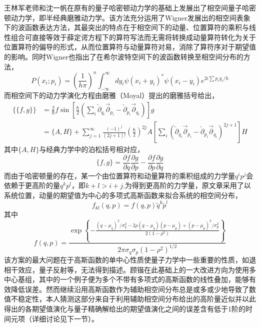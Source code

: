 王林军老师和沈一帆在原有的量子哈密顿动力学的基础上发展出了相空间量子哈密顿动力学，即半经典磨雅动力学\cite{YifanShenPSQHD,LinjunSemiclassical}。该方法充分运用了Wigner发展出的相空间表象下的波函数表达方法，其最突出的特点在于相空间下的动量、位置算符的乘积与线性组合可直接等效于薛定谔方程下的算符写法而无需将转换成动量算符转化为关于位置算符的偏导的形式\cite{wigner1997quantum}，从而位置算符与动量算符对易，消除了算符序对于期望值的影响。同时Wigner也指出了在希尔波特空间下的波函数转换至相空间分布的方法，
\begin{equation}
	P\left(x_{i} ; p_{i}\right)=\left(\frac{1}{h \pi}\right)^{n} \int_{-\infty}^{\infty} d y_{i} \psi\left(x_{i}+y_{i}\right)^{*} \psi\left(x_{i}-y_{i}\right) e^{2 i \sum p_{i} y_{i} / \hbar}
\end{equation}
而相空间下的动力学演化方程由磨雅（Moyal）提出的磨雅括号给出，
\begin{equation}
\begin{aligned}
	 \{\{f, g\}\}&=\frac{2}{\hbar} f \sin \left[\frac{\hbar}{2}\left(\sum_{i} \overleftarrow{\partial}_{q_{i}} \overrightarrow{\partial}_{p_{i}}-\overleftarrow{\partial}_{p_{i}} \overrightarrow{\partial}_{q_{i}}\right)\right] g  \\
	 &=\{A, H\}+\sum_{j=1}^{\infty} \frac{(-1)^{j}}{(2 j+1) !}\left(\frac{\hbar}{2}\right)^{2 j} A\left[\sum_i\left(\overleftarrow{\partial}_{q_{i}} \overrightarrow{\partial}_{p_{i}}-\overleftarrow{\partial}_{p_{i}} \overrightarrow{\partial}_{q_{i}}\right)^{2 j+1}\right] H
\end{aligned}
\label{Moyal_review}
\end{equation}
其中$\{A, H\}$与经典力学中的泊松括号相对应，
\begin{equation}
	\{f, g\}=\frac{\partial f}{\partial q} \frac{\partial g}{\partial p}-\frac{\partial f}{\partial p} \frac{\partial g}{\partial q}
\end{equation}
而由于哈密顿量的存在，某一个由位置算符和动量算符的乘积组成的力学量$q^i p^j$会依赖于更高阶的量$q^k p^l$，即$k+l > i+j$.为得到更高阶的力学量，原文章采用了以系统位置，动量的期望值为中心的多项式高斯函数来拟合系统的相空间分布，
\begin{equation}
f_{k l}(q, p)=f(q, p) \tilde{q}^{k} \tilde{p}^{l}
\end{equation}
其中
\begin{equation}
	f(q, p)=\frac{\exp \left\{-\frac{\left(q-\mu_{q}\right)^{2} / \sigma_{q}^{2}-2 \rho\left(q-\mu_{q}\right)\left(p-\mu_{p}\right)+\left(p-\mu_{p}\right)^{2} / \sigma_{p}^{2}}{2\left(1-\rho^{2}\right)}\right\}}{2 \pi \sigma_{q} \sigma_{p}\left(1-\rho^{2}\right)^{1 / 2}}
\end{equation}
该方案的最大问题在于高斯函数的单中心性质使量子力学中一些重要的性质，如退相干效应，量子反射等，无法得到描述\cite{YifanShenPSQHD}。顾锴在此基础上的一大改进方向为使用多中心基组，其中的一个例子便为多个不带有多项式的高斯函数的线性叠加，能够有效降低误差\cite{kaiguPSQHD}。然而继续沿用高斯函数作为辅助相空间分布总是或多或少地导致了数值不稳定性，本人猜测这部分来自于利用辅助相空间分布给出的高阶量近似并以此得出的各期望值演化与量子精确解给出的期望值演化之间的误差含有低于1阶的时间元项（详细讨论见下一节）。

